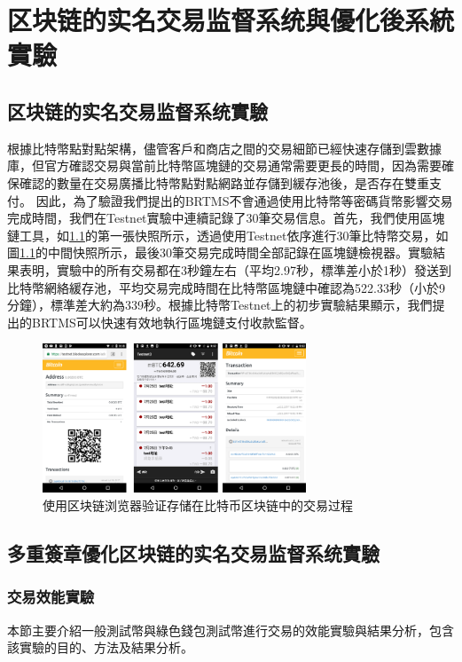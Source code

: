 
\chapter{区块链的实名交易监督系统與優化後系統實驗}

	\section{区块链的实名交易监督系统實驗}
	根據比特幣點對點架構，儘管客戶和商店之間的交易細節已經快速存儲到雲數據庫，但官方確認交易與當前比特幣區塊鏈的交易通常需要更長的時間，因為需要確保確認的數量在交易廣播比特幣點對點網路並存儲到緩存池後，是否存在雙重支付。
	因此，為了驗證我們提出的BRTMS不會通過使用比特幣等密碼貨幣影響交易完成時間，我們在Testnet實驗中連續記錄了30筆交易信息。首先，我們使用區塊鏈工具，如\ref{fig9}的第一張快照所示，透過使用Testnet依序進行30筆比特幣交易，如圖\ref{fig9}的中間快照所示，最後30筆交易完成時間全部記錄在區塊鏈檢視器。實驗結果表明，實驗中的所有交易都在3秒鐘左右（平均2.97秒，標準差小於1秒）發送到比特幣網絡緩存池，平均交易完成時間在比特幣區塊鏈中確認為522.33秒（小於9分鐘），標準差大約為339秒。根據比特幣Testnet上的初步實驗結果顯示，我們提出的BRTMS可以快速有效地執行區塊鏈支付收款監督。

	\begin{figure}[h]
		\centering
		\includegraphics[width = 0.7\textwidth]{fig9.png}
		\caption{使用区块链浏览器验证存储在比特币区块链中的交易过程}\label{fig9}
	\end{figure}

	\section{多重簽章優化区块链的实名交易监督系统實驗}
		\subsection{交易效能實驗}
		本節主要介紹一般測試幣與綠色錢包測試幣進行交易的效能實驗與結果分析，包含該實驗的目的、方法及結果分析。

